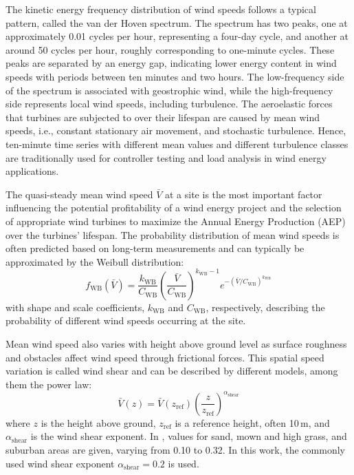 The kinetic energy frequency distribution of wind speeds follows a typical pattern, called the van der Hoven spectrum. The spectrum has two peaks, one at approximately 0.01 cycles per hour, representing a four-day cycle, and another at around 50 cycles per hour, roughly corresponding to one-minute cycles. These peaks are separated by an energy gap, indicating lower energy content in wind speeds with periods between ten minutes and two hours. The low-frequency side of the spectrum is associated with geostrophic wind, while the high-frequency side represents local wind speeds, including turbulence. The aeroelastic forces that turbines are subjected to over their lifespan are caused by mean wind speeds, i.e., constant stationary air movement, and stochastic turbulence. Hence, ten-minute time series with different mean values and different turbulence classes are traditionally used for controller testing and load analysis in wind energy applications.

The quasi-steady mean wind speed $\bar{V}$ at a site is the most important factor influencing the potential profitability of a wind energy project and the selection of appropriate wind turbines to maximize the Annual Energy Production (AEP) over the turbines' lifespan. The probability distribution of mean wind speeds is often predicted based on long-term measurements and can typically be approximated by the Weibull distribution:
\begin{equation}
    f_{\text{WB}}(\bar{V}) = \frac{k_{\text{WB}}}{C_{\text{WB}}}\left(\frac{\bar{V}}{C_{\text{WB}}}\right)^{k_{\text{WB}}-1}e^{- (\bar{V}/C_{\text{WB}})^{k_{\text{WB}}}}
\end{equation}
with shape and scale coefficients, $k_{\text{WB}}$ and $C_{\text{WB}}$, respectively, describing the probability of different wind speeds occurring at the site.

Mean wind speed also varies with height above ground level as surface roughness and obstacles affect wind speed through frictional forces. This spatial speed variation is called wind shear and can be described by different models, among them the power law:
\begin{equation}
    \bar{V}(z) =  \bar{V}(z_{\text{ref}})\left(\frac{z} {z_{\text{ref}} }\right)^{\alpha_{\text{shear}}} 
\end{equation}
where $z$ is the height above ground, $z_{\text{ref}}$ is a reference height, often 10\,m, and $\alpha_{\text{shear}}$ is the wind shear exponent. In \cite{Bianchi2007}, values for sand, mown and high grass, and suburban areas are given, varying from 0.10 to 0.32. In this work, the commonly used wind shear exponent $\alpha_{\text{shear}} = 0.2$ is used.

